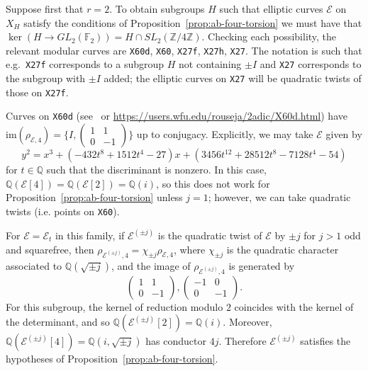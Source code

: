 \documentclass{amsart}
\theoremstyle{plain}
\theoremstyle{remark}
\newcommand{\twomat}[4]{\begin{pmatrix} #1 & #2 \\ #3 & #4 \end{pmatrix}}
\newcommand{\F}{\mathbb{F}}
\newcommand{\Q}{\mathbb{Q}}
\newcommand{\Z}{\mathbb{Z}}
\newcommand{\E}{\mathcal{E}}
\newcommand{\im}{\mathrm{im}}
\begin{document}
Suppose first that $r = 2$. To obtain subgroups $H$ such that elliptic curves $\E$ on $X_H$ satisfy the conditions of
Proposition~\ref{prop:ab-four-torsion} we must have that $\ker(H \to GL_2(\F_2)) = H\cap SL_2(\Z/4\Z)$. Checking each
possibility, the relevant modular curves are \texttt{X60d}, \texttt{X60}, \texttt{X27f}, \texttt{X27h},
\texttt{X27}. The notation is such that e.g.\ \texttt{X27f} corresponds to a subgroup $H$ not containing $\pm I$ and
\texttt{X27} corresponds to the subgroup with $\pm I$ added; the elliptic curves on \texttt{X27} will be quadratic
twists of those on \texttt{X27f}.

Curves on \texttt{X60d} (see~\cite{gonzalez-jimenezEllipticCurvesAbelian2016} or
\url{https://users.wfu.edu/rouseja/2adic/X60d.html}) have $\im(\rho_{\E, 4}) =\{I, \twomat{1}{1}{0}{-1}\}$ up to
conjugacy. Explicitly, we may take $\E$ given by
  \[y^2 = x^3 + (-432t^8 + 1512t^4 - 27)x + (3456t^{12} + 28512t^8 - 7128t^4 - 54)\]
  for $t \in \Q$ such that the discriminant is nonzero. In this case, $\Q(\E[4]) = \Q(\E[2]) = \Q(i)$, so this does not
  work for Proposition~\ref{prop:ab-four-torsion} unless $j = 1$; however, we can take quadratic twists (i.e. points on \texttt{X60}).

  For $\E = \E_t$ in this family, if $\E^{(\pm j)}$ is the quadratic twist of $\E$ by $\pm j$ for $j > 1$ odd and
  squarefree, then $\rho_{\E^{(\pm j)},4} = \chi_{\pm j}\rho_{\E,4}$, where $\chi_{\pm j}$ is the quadratic character
  associated to $\Q(\sqrt{\pm j})$, and the image of $\rho_{\E^{(\pm j)},4}$ is generated by
  \[
    \begin{pmatrix}
      1 & 1 \\
      0 & -1
    \end{pmatrix},
    \begin{pmatrix}
      -1 & 0 \\
      0 & -1
    \end{pmatrix}.
  \]
  For this subgroup, the kernel of reduction modulo $2$ coincides with the kernel of the determinant, and so
  $\Q(\E^{(\pm j)}[2]) = \Q(i)$. Moreover, $\Q(\E^{(\pm j)}[4]) = \Q(i,\sqrt{\pm j})$ has conductor $4j$. Therefore
  $\E^{(\pm j)}$ satisfies the hypotheses of Proposition~\ref{prop:ab-four-torsion}.
\end{document}
